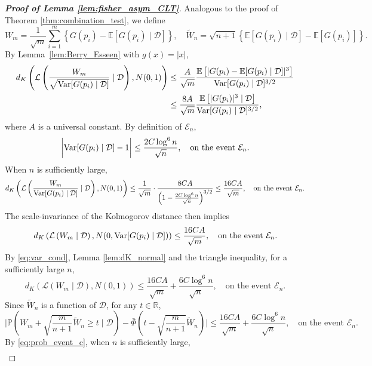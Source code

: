 \documentclass[11pt]{article}
\newcommand{\Var}{\textnormal{Var}}
\def\R{\mathbb{R}}
\def\E{\mathbb{E}}
\renewcommand{\P}{\mathbb{P}}
\newcommand{\event}{\mathcal{E}}
\newcommand{\lb}{\left(}
\newcommand{\rb}{\right)}
\begin{document}
\begin{proof}[\textbf{Proof of Lemma \ref{lem:fisher_asym_CLT}}]
Analogous to the proof of Theorem \ref{thm:combination_test}, we define
  \[W_{m} = \frac{1}{\sqrt{m}}\sum_{i=1}^{m}\left\{G(p_i) - \E[G(p_i)\mid \mathcal{D}]\right\}, \quad \tilde{W}_{n} = \sqrt{n + 1}\left\{\E[G(p_i)\mid \mathcal{D}] - \E[G(p_i)]\right\}.\]
  By Lemma~\ref{lem:Berry_Esseen} with $g(x) = |x|$,
  \begin{align*}
    d_{K}\left(\mathcal{L}\left(\frac{W_{m}}{\sqrt{\Var[G(p_i)\mid \mathcal{D}]}}\mid \mathcal{D}\right), N(0, 1)\right)&\le \frac{A}{\sqrt{m}}\frac{\E\left[|G(p_i) - \E[G(p_i)\mid \mathcal{D}]|^3\right]}{\Var[G(p_i)\mid \mathcal{D}]^{3/2}}\\
    & \le \frac{8A}{\sqrt{m}}\frac{\E\left[|G(p_i)|^3\mid \mathcal{D}\right]}{\Var[G(p_i)\mid \mathcal{D}]^{3/2}},  
  \end{align*}
where $A$ is a universal constant. By definition of $\event_{n}$,
\begin{equation}
  \label{eq:var_cond}
  \bigg|\Var[G(p_i)\mid \mathcal{D}] - 1\bigg|\le \frac{2C\log^6 n}{\sqrt{n}}, \quad \text{on the event }\event_n.
\end{equation}
When $n$ is sufficiently large,
\begin{equation*}
  d_{K}\left(\mathcal{L}\left(\frac{W_{m}}{\Var[G(p_i)\mid \mathcal{D}]}\mid \mathcal{D}\right), N(0, 1)\right)\le \frac{1}{\sqrt{m}}\cdot\frac{8CA}{\lb 1 - \frac{2C\log^6 n}{\sqrt{n}}\rb^{3/2}}\le \frac{16CA}{\sqrt{m}}, \quad \text{on the event }\event_n.
\end{equation*}
The scale-invariance of the Kolmogorov distance then implies
\[d_{K}\left(\mathcal{L}\left(W_{m}\mid \mathcal{D}\right), N(0, \Var[G(p_i)\mid \mathcal{D}])\right)\le \frac{16CA}{\sqrt{m}}, \quad \text{on the event }\event_n.
\]
By \eqref{eq:var_cond}, Lemma \ref{lem:dK_normal} and the triangle inequality, for a sufficiently large $n$,
\begin{equation}
  \label{eq:dK_normal_Wm}
  d_{K}\left(\mathcal{L}\left(W_{m}\mid \mathcal{D}\right), N(0, 1)\right)\le \frac{16CA}{\sqrt{m}} + \frac{6C\log^6 n}{\sqrt{n}},\quad \text{on the event }\event_n.
\end{equation}
Since $\tilde{W}_{n}$ is a function of $\mathcal{D}$, for any $t\in \R$,
\[\bigg|\P\lb W_{m} + \sqrt{\frac{m}{n+1}}\tilde{W}_{n}\ge t \mid \mathcal{D}\rb - \bar{\Phi}\lb t - \sqrt{\frac{m}{n+1}}\tilde{W}_{n}\rb\bigg|\le \frac{16CA}{\sqrt{m}} + \frac{6C\log^6 n}{\sqrt{n}},\quad \text{on the event }\event_n.\]
By \eqref{eq:prob_event_c}, when $n$ is sufficiently large,
\begin{align}

\end{align}
\end{proof}
\end{document}
